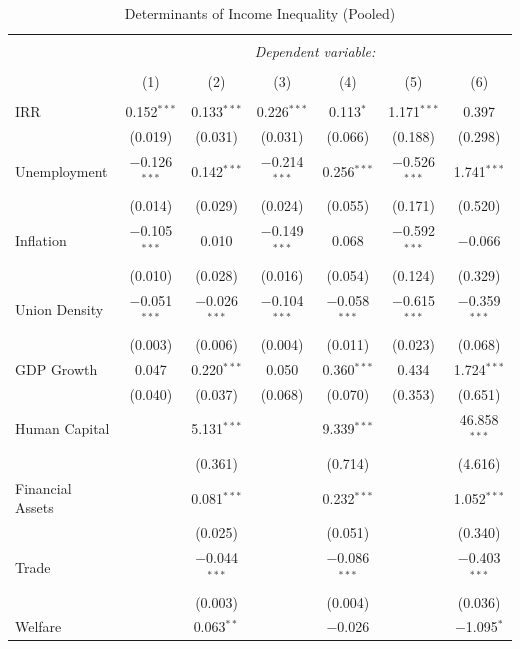 \documentclass[
  12pt,
]{article}
\begin{document}
\begin{table}[!htbp] \centering 
  \caption{\label{ineq2}Determinants of Income Inequality (Pooled)} 
  \label{} 
\small 
\begin{tabular}{@{\extracolsep{5pt}}lcccccc} 
\\[-1.8ex]\hline 
\hline \\[-1.8ex] 
 & \multicolumn{6}{c}{\textit{Dependent variable:}} \\ 
\cline{2-7} 
\\[-1.8ex] & (1) & (2) & (3) & (4) & (5) & (6)\\ 
\hline \\[-1.8ex] 
 IRR & 0.152$^{***}$ & 0.133$^{***}$ & 0.226$^{***}$ & 0.113$^{*}$ & 1.171$^{***}$ & 0.397 \\ 
  & (0.019) & (0.031) & (0.031) & (0.066) & (0.188) & (0.298) \\ 
  Unemployment & $-$0.126$^{***}$ & 0.142$^{***}$ & $-$0.214$^{***}$ & 0.256$^{***}$ & $-$0.526$^{***}$ & 1.741$^{***}$ \\ 
  & (0.014) & (0.029) & (0.024) & (0.055) & (0.171) & (0.520) \\ 
  Inflation & $-$0.105$^{***}$ & 0.010 & $-$0.149$^{***}$ & 0.068 & $-$0.592$^{***}$ & $-$0.066 \\ 
  & (0.010) & (0.028) & (0.016) & (0.054) & (0.124) & (0.329) \\ 
  Union Density & $-$0.051$^{***}$ & $-$0.026$^{***}$ & $-$0.104$^{***}$ & $-$0.058$^{***}$ & $-$0.615$^{***}$ & $-$0.359$^{***}$ \\ 
  & (0.003) & (0.006) & (0.004) & (0.011) & (0.023) & (0.068) \\ 
  GDP Growth & 0.047 & 0.220$^{***}$ & 0.050 & 0.360$^{***}$ & 0.434 & 1.724$^{***}$ \\ 
  & (0.040) & (0.037) & (0.068) & (0.070) & (0.353) & (0.651) \\ 
  Human Capital &  & 5.131$^{***}$ &  & 9.339$^{***}$ &  & 46.858$^{***}$ \\ 
  &  & (0.361) &  & (0.714) &  & (4.616) \\ 
  Financial Assets &  & 0.081$^{***}$ &  & 0.232$^{***}$ &  & 1.052$^{***}$ \\ 
  &  & (0.025) &  & (0.051) &  & (0.340) \\ 
  Trade &  & $-$0.044$^{***}$ &  & $-$0.086$^{***}$ &  & $-$0.403$^{***}$ \\ 
  &  & (0.003) &  & (0.004) &  & (0.036) \\ 
  Welfare &  & 0.063$^{**}$ &  & $-$0.026 &  & $-$1.095$^{*}$ \\ 

\end{tabular}
\end{table}
\end{document}
